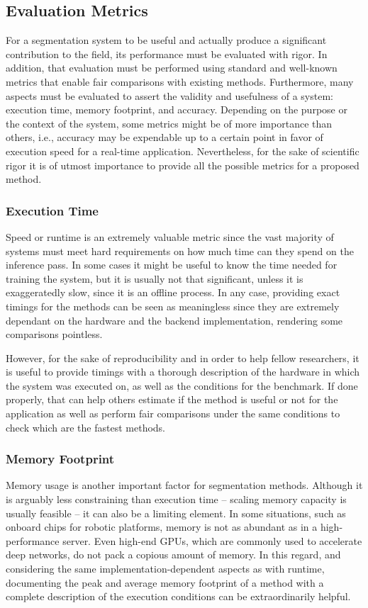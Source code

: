 \subsection{Evaluation Metrics}

For a segmentation system to be useful and actually produce a significant contribution to the field, its performance must be evaluated with rigor. In addition, that evaluation must be performed using standard and well-known metrics that enable fair comparisons with existing methods. Furthermore, many aspects must be evaluated to assert the validity and usefulness of a system: execution time, memory footprint, and accuracy. Depending on the purpose or the context of the system, some metrics might be of more importance than others, i.e., accuracy may be expendable up to a certain point in favor of execution speed for a real-time application. Nevertheless, for the sake of scientific rigor it is of utmost importance to provide all the possible metrics for a proposed method.

\subsubsection{Execution Time}

Speed or runtime is an extremely valuable metric since the vast majority of systems must meet hard requirements on how much time can they spend on the inference pass. In some cases it might be useful to know the time needed for training the system, but it is usually not that significant, unless it is exaggeratedly slow, since it is an offline process. In any case, providing exact timings for the methods can be seen as meaningless since they are extremely dependant on the hardware and the backend implementation, rendering some comparisons pointless.

However, for the sake of reproducibility and in order to help fellow researchers, it is useful to provide timings with a thorough description of the hardware in which the system was executed on, as well as the conditions for the benchmark. If done properly, that can help others estimate if the method is useful or not for the application as well as perform fair comparisons under the same conditions to check which are the fastest methods.

\subsubsection{Memory Footprint}

Memory usage is another important factor for segmentation methods. Although it is arguably less constraining than execution time -- scaling memory capacity is usually feasible -- it can also be a limiting element. In some situations, such as onboard chips for robotic platforms, memory is not as abundant as in a high-performance server. Even high-end \acp{GPU}, which are commonly used to accelerate deep networks, do not pack a copious amount of memory. In this regard, and considering the same implementation-dependent aspects as with runtime, documenting the peak and average memory footprint of a method with a complete description of the execution conditions can be extraordinarily helpful.

